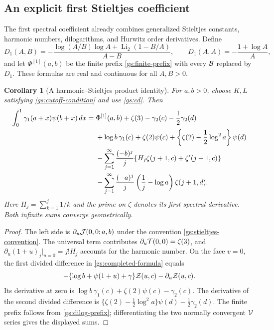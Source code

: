 \documentclass[11pt,letterpaper]{article}
\numberwithin{equation}{section}
\newtheorem{corollary}[theorem]{Corollary}
\theoremstyle{definition}
\theoremstyle{remark}
\begin{document}
\subsection{An explicit first Stieltjes coefficient}

The first spectral coefficient already combines generalized Stieltjes
constants, harmonic numbers, dilogarithms, and Hurwitz order
derivatives.  Define
\[
 D_1(A,B)=-\frac{\log(A/B)\log A+
                   \operatorname{Li}_2(1-B/A)}{A-B},
 \qquad D_1(A,A)=-\frac{1+\log A}{A},
\]
and let $\Phi^{[1]}(a,b)$ be the finite prefix
\eqref{gs:finite-prefix} with every $\mathcal B$ replaced by $D_1$.
These formulas are real and continuous for all $A,B>0$.

\begin{corollary}[A harmonic--Stieltjes product identity]
\label{gs:gamma1-digamma}
For $a,b>0$, choose $K,L$ satisfying
\eqref{gs:cutoff-condition} and use \eqref{gs:cd}.  Then
\begin{align}
 \int_0^1\gamma_1(a+x)\psi(b+x)\,dx
 ={}&\Phi^{[1]}(a,b)+\zeta(3)-\gamma_2(c)-\frac12\gamma_2(d)
       \notag\\
 &+\log b\,\gamma_1(c)+\zeta(2)\psi(c)
   +\left\{\zeta(2)-\frac12\log^2a\right\}\psi(d)\notag\\
 &-\sum_{j=1}^\infty\frac{(-b)^j}{j}
       \{H_j\zeta(j+1,c)+\zeta'(j+1,c)\}\notag\\
 &-\sum_{j=1}^\infty\frac{(-a)^j}{j}
          \left(\frac1j-\log a\right)\zeta(j+1,d).
 \label{gs:gamma1-digamma-formula}
\end{align}
Here $H_j=\sum_{k=1}^j1/k$ and the prime on $\zeta$ denotes its
first spectral derivative.  Both infinite sums converge geometrically.
\end{corollary}

\begin{proof}
The left side is $\partial_u\mathcal J(0,0;a,b)$ under the convention
\eqref{gs:stieltjes-convention}.  The universal term contributes
$\partial_u\mathcal T(0,0)=\zeta(3)$, and
$\partial_u(1+u)_j|_{u=0}=j!H_j$ accounts for the harmonic number.
On the face $v=0$, the first divided difference in
\eqref{gs:completed-formula} equals
\[
 -\{\log b+\psi(1+u)+\gamma\}\mathcal Z(u,c)
 -\partial_u\mathcal Z(u,c).
\]
Its derivative at zero is
$\log b\,\gamma_1(c)+\zeta(2)\psi(c)-\gamma_2(c)$.
The derivative of the second divided difference is
$\{\zeta(2)-\tfrac12\log^2a\}\psi(d)-\tfrac12\gamma_2(d)$.
The finite prefix follows from \eqref{gs:dilog-prefix}; differentiating
the two normally convergent $\mathcal V$ series gives the displayed sums.
\end{proof}
\end{document}
